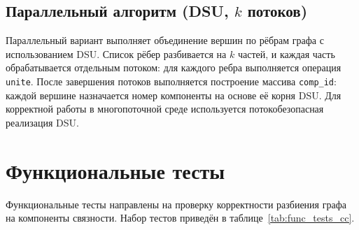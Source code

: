 \subsection{Параллельный алгоритм (DSU, $k$ потоков)}

Параллельный вариант выполняет объединение вершин по рёбрам графа с использованием DSU.
Список рёбер разбивается на $k$ частей, и каждая часть обрабатывается отдельным потоком: для каждого ребра выполняется операция \texttt{unite}.
После завершения потоков выполняется построение массива \texttt{comp\_id}: каждой вершине назначается номер компоненты на основе её корня DSU.
Для корректной работы в многопоточной среде используется потокобезопасная реализация DSU.

\section{Функциональные тесты}

Функциональные тесты направлены на проверку корректности разбиения графа на компоненты связности.
Набор тестов приведён в таблице~\ref{tab:func_tests_cc}.

